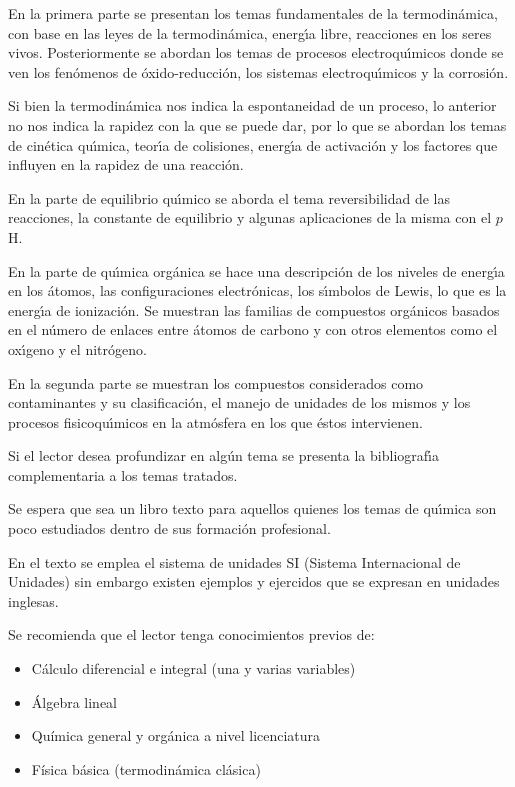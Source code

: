 \documentclass[
    11pt,                %
    twoside,             %
    openright,           %
    spanish,             %
]{book}
\begin{document}
 En la primera parte se presentan los temas fundamentales de la termodin\'amica, con base en las leyes de la termodin\'amica, energ\'{\i}a libre, reacciones en los seres vivos. Posteriormente se abordan los temas de procesos electroqu\'{\i}micos donde se ven los fen\'omenos de \'oxido-reducci\'on, los sistemas electroqu\'{\i}micos y la corrosi\'on.
 
 Si bien la termodin\'amica nos indica la espontaneidad de un proceso, lo anterior no nos indica la rapidez con la que se puede dar, por lo que se abordan los temas de cin\'etica qu\'{\i}mica, teor\'{\i}a de colisiones, energ\'{\i}a de activaci\'on  y los factores que influyen en la rapidez de una reacci\'on.
 
 En la parte de equilibrio qu\'{\i}mico se aborda el tema reversibilidad de las reacciones, la constante de equilibrio y algunas aplicaciones de la misma con el $p$H.
 
 En la parte de qu\'{\i}mica org\'anica se hace una descripci\'on de los niveles de energ\'{\i}a en los \'atomos, las configuraciones electr\'onicas, los s\'{\i}mbolos de Lewis, lo que es la energ\'{\i}a de ionizaci\'on. Se muestran las familias de compuestos org\'anicos basados en el n\'umero de enlaces entre \'atomos de carbono y con otros elementos como el ox\'{\i}geno y el nitr\'ogeno.
 
 En la segunda parte se muestran los compuestos considerados como contaminantes y su clasificaci\'on, el manejo de unidades de los mismos y los procesos fisicoqu\'{\i}micos  en la atm\'osfera en los que \'estos intervienen.
 
 Si el lector desea profundizar en  alg\'un tema se presenta la bibliograf\'{\i}a complementaria a los temas tratados.
 
 Se espera que sea un libro texto para aquellos quienes los temas de qu\'{\i}mica son poco estudiados dentro de sus formaci\'on profesional.
 

En el texto se emplea el sistema de unidades SI (Sistema Internacional de Unidades)  sin embargo existen ejemplos y ejercidos que se expresan en unidades inglesas.



\medskip
\noindent
Se recomienda que el lector tenga conocimientos previos de:
\begin{itemize}
    \item C\'alculo diferencial e integral (una y varias variables)
    \item \'Algebra lineal
    \item Qu\'imica general y org\'anica a nivel licenciatura
    \item F\'isica b\'asica (termodin\'amica cl\'asica)
\end{itemize}
\end{document}
